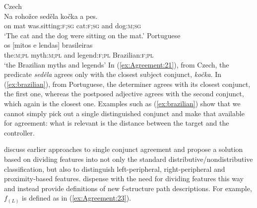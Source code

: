 \documentclass[output=paper,hidelinks]{langscibook}
\begin{document}
\ea\label{ex:Agreement:21} Czech\\
\gll Na rohožce seděla kočka a pes.\\
on mat was.sitting:\textsc{f;sg} cat:\textsc{f;sg} and dog:\textsc{m;sg}\\
\glt `The cat and the dog were sitting on the mat.'
\z
\ea\label{ex:brazilian} Portuguese\\
\gll os [mitos e lendas] brasileiras\\
the:\textsc{m;pl} \phantom{[}myth:\textsc{m;pl} and legend:\textsc{f;pl} Brazilian:\textsc{f;pl} \\
\glt `the Brazilian myths and legends'
\z
In (\ref{ex:Agreement:21}), from Czech, the predicate \textit{seděla} agrees only with the closest
subject conjunct, \textit{kočka}. In (\ref{ex:brazilian}), from Portuguese, the determiner agrees with
its closest conjunct, the first one, whereas the postposed adjective
agrees with the second conjunct, which again is the closest
one. Examples such as (\ref{ex:brazilian}) show that we cannot simply pick out a
single distinguished conjunct and make that available for agreement:
what is relevant is the distance between the target and the
controller.

\citet{KuhnSadler:LFG07} discuss earlier approaches to single conjunct
agreement and propose a solution based on dividing features into not
only the standard distributive/nondistributive classification, but
also to distinguish left-peripheral, right-peripheral and
proximity-based features. \citet{DH:Agr} dispense with the need for
dividing features this way and instead provide definitions of new
f-structure path descriptions. For example, $f_{(L)}$ is defined as in (\ref{ex:Agreement:23}).
\end{document}
